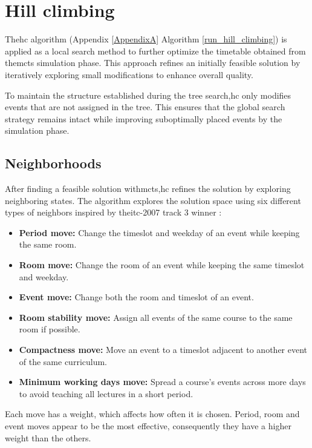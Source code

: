 \section{Hill climbing}\label{hill_climbing_section}

The\ac{hc} algorithm (Appendix \ref{AppendixA} Algorithm \ref{run_hill_climbing}) is applied as a local search method to further optimize the timetable obtained from the\ac{mcts} simulation phase. This approach refines an initially feasible solution by iteratively exploring small modifications to enhance overall quality.

To maintain the structure established during the tree search,\ac{hc} only modifies events that are not assigned in the tree. This ensures that the global search strategy remains intact while improving suboptimally placed events by the simulation phase.

\subsection{Neighborhoods}

After finding a feasible solution with\ac{mcts},\ac{hc} refines the solution by exploring neighboring states. The algorithm explores the solution space using six different types of neighbors inspired by the\ac{itc-2007} track 3 winner \cite{muller_itc2007}:

\begin{itemize}
\item \textbf{Period move:} Change the timeslot and weekday of an event while keeping the same room.
\item \textbf{Room move:} Change the room of an event while keeping the same timeslot and weekday.
\item \textbf{Event move:} Change both the room and timeslot of an event.
\item \textbf{Room stability move:} Assign all events of the same course to the same room if possible.
\item \textbf{Compactness move:} Move an event to a timeslot adjacent to another event of the same curriculum.
\item \textbf{Minimum working days move:} Spread a course's events across more days to avoid teaching all lectures in a short period.
\end{itemize}

Each move has a weight, which affects how often it is chosen. Period, room and event moves appear to be the most effective, consequently they have a higher weight than the others.

